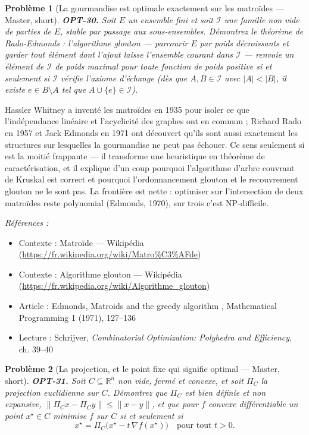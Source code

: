 \documentclass[11pt]{article}
\newtheorem{problem}{Problème}
\newenvironment{refs}{\par\small\noindent\emph{Références :}\begin{itemize}\setlength\itemsep{0pt}}{\end{itemize}\normalsize}
\begin{document}
\bigskip

\begin{problem}[{La gourmandise est optimale exactement sur les matroïdes --- Master, short}]
\textbf{OPT-30.} Soit $E$ un ensemble fini et soit $\mathcal{I}$ une
famille non vide de parties de $E$, stable par passage aux sous-ensembles. Démontrez le théorème
de Rado-Edmonds : l'algorithme glouton --- parcourir $E$ par poids décroissants et garder tout
élément dont l'ajout laisse l'ensemble courant dans $\mathcal{I}$ --- renvoie un élément de
$\mathcal{I}$ de poids maximal pour \textit{toute} fonction de poids positive si et seulement si
$\mathcal{I}$ vérifie l'axiome d'échange (dès que $A, B \in \mathcal{I}$ avec $|A| <|B|$,
il existe $e \in B \setminus A$ tel que $A \cup \{e\} \in \mathcal{I}$).
\end{problem}

\noindent Hassler Whitney a inventé les matroïdes en 1935 pour isoler ce que
l'indépendance linéaire et l'acyclicité des graphes ont en commun ; Richard Rado en 1957 et Jack
Edmonds en 1971 ont découvert qu'ils sont aussi exactement les structures sur lesquelles la
gourmandise ne peut pas échouer. Ce sens \og{} seulement si \fg{} est la moitié frappante --- il transforme
une heuristique en théorème de caractérisation, et il explique d'un coup pourquoi l'algorithme
d'arbre couvrant de Kruskal est correct et pourquoi l'ordonnancement glouton et le recouvrement
glouton ne le sont pas. La frontière est nette : optimiser sur l'intersection de deux matroïdes
reste polynomial (Edmonds, 1970), sur trois c'est NP-difficile.

\begin{refs}
\item Contexte : Matroïde --- Wikipédia (\url{https://fr.wikipedia.org/wiki/Matro%C3%AFde})
\item Contexte : Algorithme glouton --- Wikipédia (\url{https://fr.wikipedia.org/wiki/Algorithme_glouton})
\item Article : Edmonds, \og{} Matroids and the greedy algorithm \fg{}, Mathematical Programming 1 (1971), 127--136
\item Lecture : Schrijver, \textit{Combinatorial Optimization: Polyhedra and Efficiency}, ch. 39--40
\end{refs}

\bigskip

\begin{problem}[{La projection, et le point fixe qui signifie optimal --- Master, short}]
\textbf{OPT-31.} Soit $C \subseteq \mathbb{R}^n$ non vide, fermé et
convexe, et soit $\Pi_C$ la projection euclidienne sur $C$. Démontrez que $\Pi_C$ est bien
définie et non expansive, $\|\Pi_C x - \Pi_C y\| \le \|x - y\|$, et que pour $f$ convexe
différentiable un point $x^\star \in C$ minimise $f$ sur $C$ si et seulement si
\[ x^\star = \Pi_C\bigl( x^\star - t\,\nabla f(x^\star) \bigr) \quad\text{pour tout } t >0. \]
\end{problem}
\end{document}
